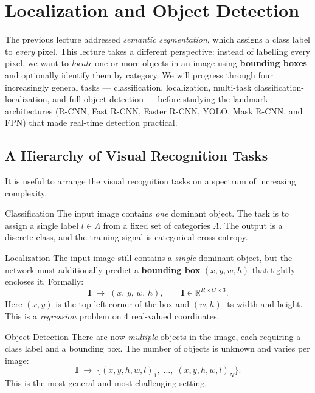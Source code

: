 \documentclass[11pt,a4paper]{article}
\newcommand{\term}[1]{\textcolor{DefGreen}{\textbf{#1}}\index{#1}}
\begin{document}
\section{Localization and Object Detection}
\label{sec:localization_detection}

The previous lecture addressed \emph{semantic segmentation}, which assigns a class label to \emph{every} pixel. This lecture takes a different perspective: instead of labelling every pixel, we want to \emph{locate} one or more objects in an image using \term{bounding boxes} and optionally identify them by category. We will progress through four increasingly general tasks — classification, localization, multi-task classification-localization, and full object detection — before studying the landmark architectures (R-CNN, Fast R-CNN, Faster R-CNN, YOLO, Mask R-CNN, and FPN) that made real-time detection practical.

\subsection{A Hierarchy of Visual Recognition Tasks}
\label{sec:task_hierarchy}

It is useful to arrange the visual recognition tasks on a spectrum of increasing complexity.

\begin{defbox}{Classification}
The input image contains \emph{one} dominant object. The task is to assign a single label $l \in \Lambda$ from a fixed set of categories $\Lambda$. The output is a discrete class, and the training signal is categorical cross-entropy.
\end{defbox}

\begin{defbox}{Localization}
The input image still contains a \emph{single} dominant object, but the network must additionally predict a \term{bounding box} $(x, y, w, h)$ that tightly encloses it. Formally:
\[
  \mathbf{I} \;\longrightarrow\; (x,\,y,\,w,\,h), \qquad \mathbf{I} \in \mathbb{R}^{R \times C \times 3}.
\]
Here $(x, y)$ is the top-left corner of the box and $(w, h)$ its width and height. This is a \emph{regression} problem on 4 real-valued coordinates.
\end{defbox}

\begin{defbox}{Object Detection}
There are now \emph{multiple} objects in the image, each requiring a class label and a bounding box. The number of objects is unknown and varies per image:
\[
  \mathbf{I} \;\longrightarrow\; \bigl\{(x, y, h, w, l)_1,\; \ldots,\; (x, y, h, w, l)_N\bigr\}.
\]
This is the most general and most challenging setting.
\end{defbox}
\end{document}
